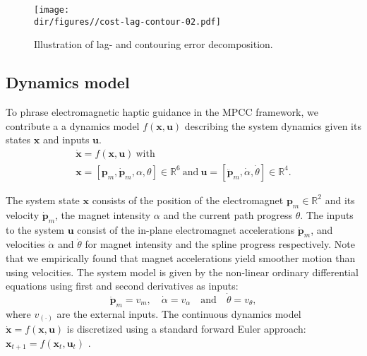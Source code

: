 \begin{figure}[!t]
    \centering
    \texttt{[image: \\dir/figures//cost-lag-contour-02.pdf]}
    \caption{Illustration of lag- and contouring error decomposition.}
    \label{fig:elc}
    \vspace{-1em}
\end{figure}

\subsection{Dynamics model}
To phrase electromagnetic haptic guidance in the MPCC framework, we contribute a a dynamics model $f(\mathbf{x},\mathbf{u})$ describing the system dynamics given its states $\mathbf{x}$ and inputs $\mathbf{u}$.  
\begin{equation}
\begin{gathered}
\label{eq:model}
    \dot{\mathbf{x}} = f(\mathbf{x}, \mathbf{u}) ~\text{with}\\
    \mathbf{x} = [\mathbf{p}_{m},\dot{\mathbf{p}}_{m}, \alpha, \theta] \in \mathbb{R}^6
    ~\text{and} ~
    \mathbf{u} = [\ddot{\mathbf{p}}_{m}, \dot{\alpha}, \dot{\theta}] \in \mathbb{R}^4.
\end{gathered}
\end{equation}

The system state $\mathbf{x}$ consists of the position of the electromagnet $\mathbf{p}_{m} \in  \mathbb{R}^2$ and its velocity $\dot{\mathbf{p}}_{m}$, the magnet intensity $\alpha$ and the current path progress $\theta$.
The inputs to the system $\mathbf{u}$ consist of the in-plane electromagnet accelerations $\ddot{\mathbf{p}}_{m}$, and velocities $\dot{\alpha}$ and $\dot{\theta}$ for magnet intensity and the spline progress respectively.
Note that we empirically found that magnet accelerations yield smoother motion than using velocities. 
% 
The system model is given by the non-linear ordinary differential equations using first and second derivatives as inputs:
\begin{equation}
  \ddot{\mathbf{p}}_{m} = v_{m}, \quad \dot{\alpha} = v_{\alpha} \quad \text{and} \quad \dot{\theta} = v_{\theta} ,  
\end{equation}
where $v_{\left(\cdot\right)}$ are the external inputs. 
The continuous dynamics model $\dot{\mathbf{x}} = f(\mathbf{x}, \mathbf{u})$ is discretized using a standard forward Euler approach: $\mathbf{x}_{t+1} = f(\mathbf{x}_t, \mathbf{u}_t)$ \cite{gibbs2011advanced}.

